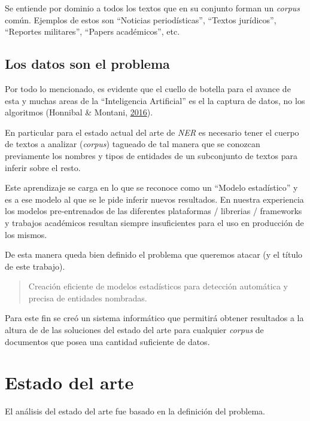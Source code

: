 \documentclass[12pt,a4paper,]{scrartcl}
\begin{document}
Se entiende por dominio a todos los textos que en su conjunto forman un \emph{corpus} común. Ejemplos de estos son \enquote{Noticias periodísticas}, \enquote{Textos jurídicos}, \enquote{Reportes militares}, \enquote{Papers académicos}, etc.

\hypertarget{los-datos-son-el-problema}{%
\subsection{Los datos son el problema}\label{los-datos-son-el-problema}}

Por todo lo mencionado, es evidente que el cuello de botella para el avance de esta y muchas areas de la \enquote{Inteligencia Artificial} es el la captura de datos, no los algoritmos (Honnibal \& Montani, \protect\hyperlink{ref-montani_AI}{2016}).

En particular para el estado actual del arte de \emph{NER} es necesario tener el cuerpo de textos a analizar (\emph{corpus}) tagueado de tal manera que se conozcan previamente los nombres y tipos de entidades de un subconjunto de textos para inferir sobre el resto.

Este aprendizaje se carga en lo que se reconoce como un \enquote{Modelo estadístico} y es a ese modelo al que se le pide inferir nuevos resultados. En nuestra experiencia los modelos pre-entrenados de las diferentes plataformas / librerias / frameworks y trabajos académicos resultan siempre insuficientes para el uso en producción de los mismos.

De esta manera queda bien definido el problema que queremos atacar (y el título de este trabajo).

\begin{quote}
Creación eficiente de modelos estadísticos para detección automática y precisa de entidades nombradas.
\end{quote}

Para este fin se creó un sistema informático que permitirá obtener resultados a la altura de de las soluciones del estado del arte para cualquier \emph{corpus} de documentos que posea una cantidad suficiente de datos.

\newpage

\hypertarget{state-of-art}{%
\section{Estado del arte}\label{state-of-art}}

El análisis del estado del arte fue basado en la definición del problema.
\end{document}
